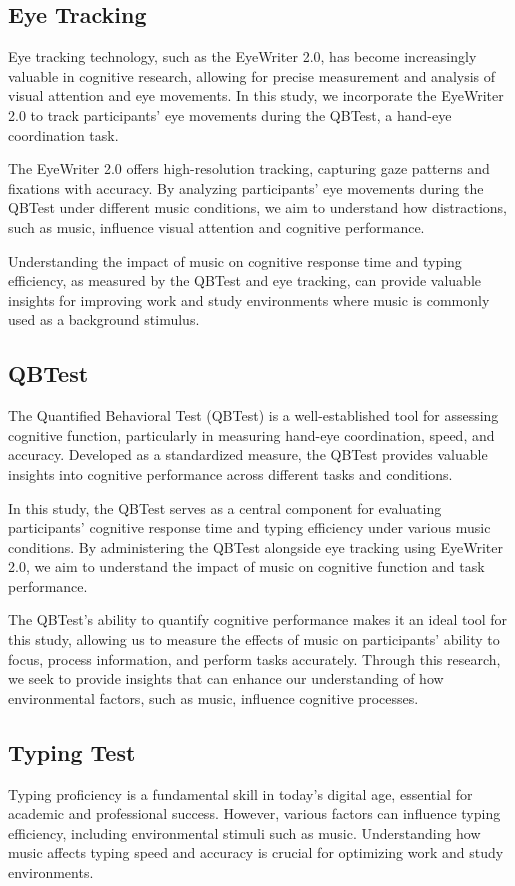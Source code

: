 \documentclass[manuscript, screen]{acmart} %
\begin{document}
\subsection{Eye Tracking}
Eye tracking technology, such as the EyeWriter 2.0, has become increasingly valuable in cognitive research, allowing for precise measurement and analysis of visual attention and eye movements. In this study, we incorporate the EyeWriter 2.0 to track participants' eye movements during the QBTest, a hand-eye coordination task.

The EyeWriter 2.0 offers high-resolution tracking, capturing gaze patterns and fixations with accuracy. By analyzing participants' eye movements during the QBTest under different music conditions, we aim to understand how distractions, such as music, influence visual attention and cognitive performance.

Understanding the impact of music on cognitive response time and typing efficiency, as measured by the QBTest and eye tracking, can provide valuable insights for improving work and study environments where music is commonly used as a background stimulus.

\subsection{QBTest}
The Quantified Behavioral Test (QBTest) is a well-established tool for assessing cognitive function, particularly in measuring hand-eye coordination, speed, and accuracy. Developed as a standardized measure, the QBTest provides valuable insights into cognitive performance across different tasks and conditions.

In this study, the QBTest serves as a central component for evaluating participants' cognitive response time and typing efficiency under various music conditions. By administering the QBTest alongside eye tracking using EyeWriter 2.0, we aim to understand the impact of music on cognitive function and task performance.

The QBTest's ability to quantify cognitive performance makes it an ideal tool for this study, allowing us to measure the effects of music on participants' ability to focus, process information, and perform tasks accurately. Through this research, we seek to provide insights that can enhance our understanding of how environmental factors, such as music, influence cognitive processes.

\subsection{Typing Test}
Typing proficiency is a fundamental skill in today's digital age, essential for academic and professional success. However, various factors can influence typing efficiency, including environmental stimuli such as music. Understanding how music affects typing speed and accuracy is crucial for optimizing work and study environments.
\end{document}
